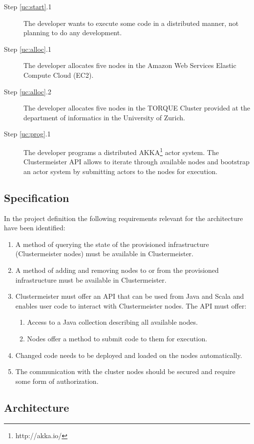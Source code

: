 \documentclass[english]{uzhpub}
\begin{document}
\begin{description}
\item[Step \ref{uc:start}.1] The developer wants to execute some code in a distributed manner, not planning to do any development.
\item[Step \ref{uc:alloc}.1] The developer allocates five nodes in the Amazon Web Services Elastic Compute Cloud (EC2).
\item[Step \ref{uc:alloc}.2] The developer allocates five nodes in the TORQUE Cluster provided at the department of informatics in the University of Zurich.
\item[Step \ref{uc:prog}.1] The developer programs a distributed AKKA\footnote{http://akka.io/} actor system. The Clustermeister API allows to iterate through available nodes and bootstrap an actor system by submitting actors to the nodes for execution.
\end{description}

\subsection{Specification}
In the project definition the following requirements relevant for the architecture have been identified:

\begin{enumerate}
\item A method of querying the state of the provisioned infrastructure (Clustermeister nodes) must be available in Clustermeister.
\item A method of adding and removing nodes to or from the provisioned infrastructure must be available in Clustermeister.
\item Clustermeister must offer an API that can be used from Java and Scala and enables user code to interact with Clustermeister nodes. The API must offer:
\begin{enumerate}
\item Access to a Java collection describing all available nodes.
\item Nodes offer a method to submit code to them for execution.
\end{enumerate}
\item Changed code needs to be deployed and loaded on the nodes automatically.
\item The communication with the cluster nodes should be secured and require some form of authorization. 
\end{enumerate}

\subsection{Architecture}
\end{document}
